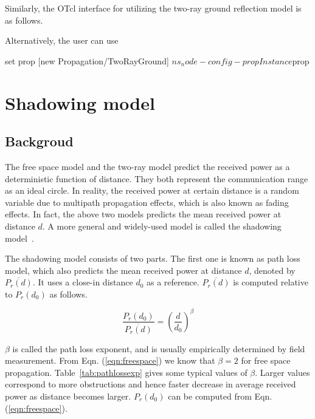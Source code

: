 Similarly, the OTcl interface for utilizing the two-ray ground reflection model
is as follows.


Alternatively, the user can use

\begin{program}
set prop [new Propagation/TwoRayGround]
$ns_ node-config -propInstance $prop
\end{program}


\section{Shadowing model}
\label{sec:shadowing}

\subsection{Backgroud}

The free space model and the two-ray model predict the received power
as a deterministic function of distance. They both represent the communication
range as an ideal circle. In reality, the received power at certain distance
is a random variable due to multipath propagation effects, which is also
known as fading effects. In fact, the above two models predicts the mean
received power at distance $d$. A more general and widely-used model is
called the shadowing model~\cite{Rappaport96}.

The shadowing model consists of two parts. The first one is known as path
loss model, which also predicts the mean received power at distance $d$,
denoted by $$. It uses a close-in distance $d_0$ as
a reference. $$ is computed relative to $P_r(d_0)$
as follows.

\begin{equation}
  \frac{P_r(d_0)}{\overline{P_r(d)}} = {\left( \frac{d}{d_0} \right)}^\beta
  \label{eqn:pathloss}
\end{equation}

$\beta$ is called the path loss exponent, and is usually empirically
determined by field measurement. From Eqn. (\ref{eqn:freespace}) we
know that $\beta = 2$ for free space propagation. Table~\ref{tab:pathlossexp}
gives some typical values of $\beta$.
Larger values correspond to more obstructions and hence faster
decrease in average received power as distance becomes larger. $P_r(d_0)$
can be computed from Eqn. (\ref{eqn:freespace}).

